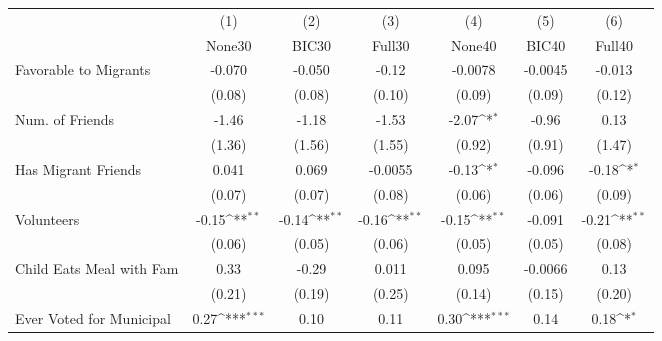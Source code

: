 {
\def\sym#1{\ifmmode^{#1}\else\(^{#1}\)\fi}
\begin{tabular}{l*{6}{c}}
\toprule
            &\multicolumn{1}{c}{(1)}&\multicolumn{1}{c}{(2)}&\multicolumn{1}{c}{(3)}&\multicolumn{1}{c}{(4)}&\multicolumn{1}{c}{(5)}&\multicolumn{1}{c}{(6)}\\
            &\multicolumn{1}{c}{None30}&\multicolumn{1}{c}{BIC30}&\multicolumn{1}{c}{Full30}&\multicolumn{1}{c}{None40}&\multicolumn{1}{c}{BIC40}&\multicolumn{1}{c}{Full40}\\
\midrule
Favorable to Migrants&      -0.070         &      -0.050         &       -0.12         &     -0.0078         &     -0.0045         &      -0.013         \\
            &      (0.08)         &      (0.08)         &      (0.10)         &      (0.09)         &      (0.09)         &      (0.12)         \\
\addlinespace
Num. of Friends&       -1.46         &       -1.18         &       -1.53         &       -2.07\sym{*}  &       -0.96         &        0.13         \\
            &      (1.36)         &      (1.56)         &      (1.55)         &      (0.92)         &      (0.91)         &      (1.47)         \\
\addlinespace
Has Migrant Friends&       0.041         &       0.069         &     -0.0055         &       -0.13\sym{*}  &      -0.096         &       -0.18\sym{*}  \\
            &      (0.07)         &      (0.07)         &      (0.08)         &      (0.06)         &      (0.06)         &      (0.09)         \\
\addlinespace
Volunteers  &       -0.15\sym{**} &       -0.14\sym{**} &       -0.16\sym{**} &       -0.15\sym{**} &      -0.091         &       -0.21\sym{**} \\
            &      (0.06)         &      (0.05)         &      (0.06)         &      (0.05)         &      (0.05)         &      (0.08)         \\
\addlinespace
Child Eats Meal with Fam&        0.33         &       -0.29         &       0.011         &       0.095         &     -0.0066         &        0.13         \\
            &      (0.21)         &      (0.19)         &      (0.25)         &      (0.14)         &      (0.15)         &      (0.20)         \\
\addlinespace
Ever Voted for Municipal&        0.27\sym{***}&        0.10         &        0.11         &        0.30\sym{***}&        0.14         &        0.18\sym{*}  \\

\end{tabular}}
